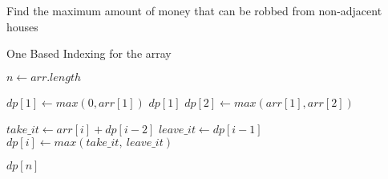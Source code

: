 \documentclass[12pt]{article}
\begin{document}
\begin{algorithm}

  \caption{Find the maximum amount of money that can be robbed from non-adjacent houses}
\begin{algorithmic}[1]
    \Ensure One Based Indexing for the array
    \Statex
    
    
        
        \Statex
        \State $n \gets arr.length$
        
        
        \State $dp[1] \gets max(0,arr[1])$
        \Statex
        \State \Return $dp[1]$
        \EndIf
        \Statex
        \State $dp[2] \gets max(arr[1],arr[2])$
        
        
            \State $take\_it \gets arr[i] + dp[i-2]$
            \State $leave\_it \gets dp[i-1]$
            \State $dp[i] \gets max(take\_it, \ leave\_it)$
        \EndFor
        
        \Statex
        
        \State \Return $dp[n]$
        
    \EndFunction
  \end{algorithmic}
  
\end{algorithm}
\end{document}
